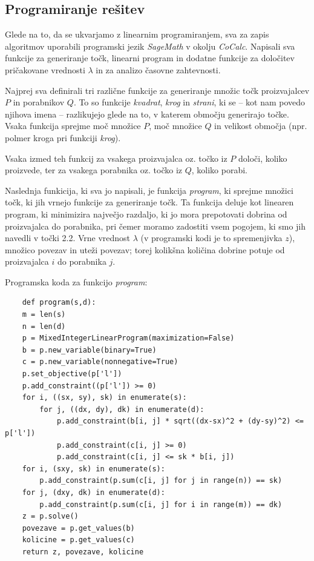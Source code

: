 \documentclass[a4paper, 11pt]{article}
\begin{document}
\subsection{Programiranje rešitev}
Glede na to, da se ukvarjamo z linearnim programiranjem, sva za zapis algoritmov 
uporabili programski jezik \emph{SageMath} v okolju \emph{CoCalc}. Napisali sva funkcije 
za generiranje točk, linearni program in dodatne funkcije za določitev pričakovane vrednosti $\lambda$
in za analizo časovne zahtevnosti. \par
Najprej sva definirali tri različne funkcije za generiranje množic točk proizvajalcev $P$ in 
porabnikov $Q$. To so funkcije \emph{kvadrat}, \emph{krog} in \emph{strani}, ki se -- kot
nam povedo njihova imena -- razlikujejo glede na to, v katerem območju generirajo točke.
Vsaka funkcija sprejme moč množice $P$, moč množice $Q$ in velikost območja (npr. polmer kroga pri
funkciji \emph{krog}). \par
Vsaka izmed teh funkcij za vsakega proizvajalca oz. točko iz $P$ določi, koliko proizvede,
ter za vsakega porabnika oz. točko iz $Q$, koliko porabi. \par
Naslednja funkicija, ki sva jo napisali, je funkcija \emph{program}, ki sprejme množici 
točk, ki jih vrnejo funkcije za generiranje točk. Ta funkcija deluje kot linearen program,
ki minimizira največjo razdaljo, ki jo mora prepotovati dobrina 
od proizvajalca do porabnika, pri čemer moramo zadostiti vsem pogojem, ki smo jih navedli v točki 2.2.
Vrne vrednost $\lambda$ (v programski kodi je to spremenjivka $z$), množico povezav in uteži povezav; torej
kolikšna količina dobrine potuje od proizvajalca $i$ do porabnika $j$. \par


\pagebreak
Programska koda za funkcijo \emph{program}:

\begin{verbatim}
    def program(s,d):
    m = len(s)
    n = len(d)
    p = MixedIntegerLinearProgram(maximization=False)
    b = p.new_variable(binary=True)
    c = p.new_variable(nonnegative=True)
    p.set_objective(p['l'])
    p.add_constraint((p['l']) >= 0)
    for i, ((sx, sy), sk) in enumerate(s):
        for j, ((dx, dy), dk) in enumerate(d):
            p.add_constraint(b[i, j] * sqrt((dx-sx)^2 + (dy-sy)^2) <= p['l'])
            p.add_constraint(c[i, j] >= 0)
            p.add_constraint(c[i, j] <= sk * b[i, j])
    for i, (sxy, sk) in enumerate(s):
        p.add_constraint(p.sum(c[i, j] for j in range(n)) == sk)
    for j, (dxy, dk) in enumerate(d):
        p.add_constraint(p.sum(c[i, j] for i in range(m)) == dk)
    z = p.solve()
    povezave = p.get_values(b)
    kolicine = p.get_values(c)
    return z, povezave, kolicine
\end{verbatim}
\end{document}
